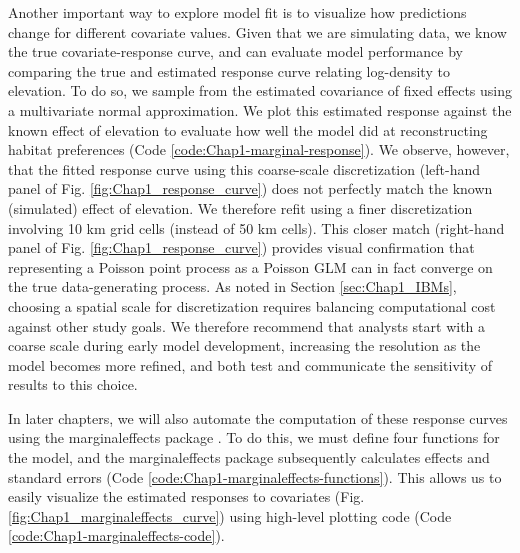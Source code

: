 Another important way to explore model fit is to visualize how predictions change for different covariate values.  Given that we are simulating data, we know the true covariate-response curve, and can evaluate model performance by comparing the true and estimated response curve relating log-density to elevation. To do so, we sample from the estimated covariance of fixed effects using a multivariate normal approximation.  We plot this estimated response against the known effect of elevation to evaluate how well the model did at reconstructing habitat preferences (Code \ref{code:Chap1-marginal-response}).  We observe, however, that the fitted response curve using this coarse-scale discretization (left-hand panel of Fig. \ref{fig:Chap1_response_curve}) does not perfectly match the known (simulated) effect of elevation.  We therefore refit using a finer discretization involving 10 km grid cells (instead of 50 km cells). This closer match (right-hand panel of Fig. \ref{fig:Chap1_response_curve}) provides visual confirmation that representing a Poisson point process as a Poisson GLM can in fact converge on the true data-generating process.  As noted in Section \ref{sec:Chap1_IBMs}, choosing a spatial scale for discretization requires balancing computational cost against other study goals.  We therefore recommend that analysts start with a coarse scale during early model development, increasing the resolution as the model becomes more refined, and both test and communicate the sensitivity of results to this choice. 

In later chapters, we will also automate the computation of these response curves using the \colorbox{backcolour}{marginaleffects} package \cite{arel-bundock_marginaleffects_2022}. To do this, we must define four functions for the model, and the \colorbox{backcolour}{marginaleffects} package subsequently calculates effects and standard errors (Code \ref{code:Chap1-marginaleffects-functions}).  This allows us to easily visualize the estimated responses to covariates (Fig. \ref{fig:Chap1_marginaleffects_curve}) using high-level plotting code (Code \ref{code:Chap1-marginaleffects-code}). 

\lstset{style=Rcode}
 

